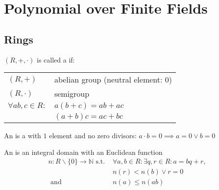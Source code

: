 

\section{Polynomial over Finite Fields}

\subsection{Rings}
\begin{definition}
$(R,+,\cdot)$ is called a  if:

\begin{center}
\begin{tabular}{ll}
  $(R,+)$ & abelian group (neutral element: 0)\\
  $(R,\cdot)$ & semigroup \\
  $\forall ab,c \in R:$ & $a(b+c) = ab+ac$\\
                        & $(a+b)c = ac+bc$\\
\end{tabular}
\end{center}
\end{definition}

\begin{definition}
An  is a  with $1$ element and no zero divisors: $a\cdot b = 0 \implies a=0 \lor b = 0$
\end{definition}

\begin{definition}
An  is an integral domain with an Euclidean function
\begin{align*}
  n: R \backslash \{0\} \rightarrow \mathbb{N} \text{ s.t. } &\forall a,b \in R: \exists q,r \in R: a = bq + r, \\
  &n(r) < n(b) \lor r=0 \\
  \text{ and } &n(a) \leq n(ab)
\end{align*}
\end{definition}

